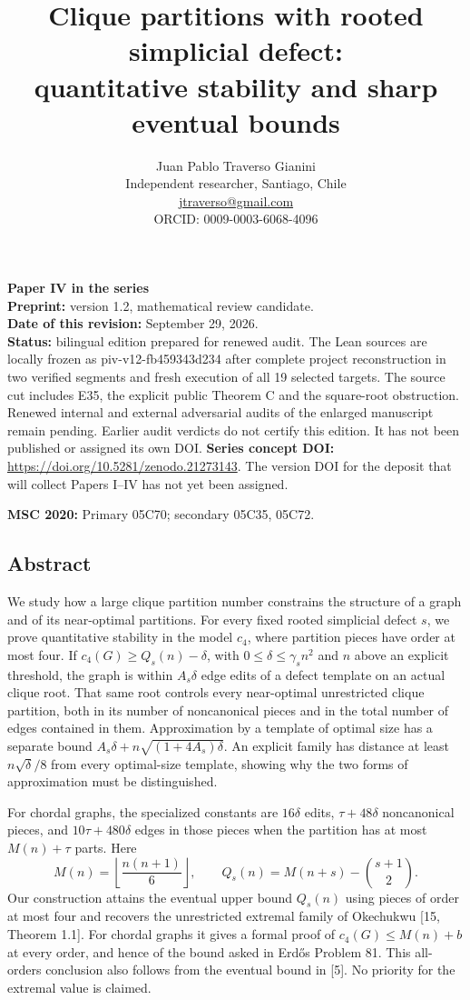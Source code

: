 \documentclass[english,11pt,a4paper]{article}
\title{Clique partitions with rooted simplicial defect:\\quantitative stability and sharp eventual bounds}
\author{Juan Pablo Traverso Gianini\\
\small Independent researcher, Santiago, Chile\\
\small \href{mailto:jtraverso@gmail.com}{jtraverso@gmail.com}\\
\small ORCID: 0009-0003-6068-4096}
\date{}
\begin{document}
\raggedbottom
\maketitle
\textbf{Paper IV in the series}\\
\textbf{Preprint:} version 1.2, mathematical review candidate.\\
\textbf{Date of this revision:} September 29, 2026.\\
\textbf{Status:} bilingual edition prepared for renewed audit. The Lean sources are locally frozen as {\ttfamily\small piv-\discretionary{\hbox{\ensuremath{\hookrightarrow}}}{}{}v12-\discretionary{\hbox{\ensuremath{\hookrightarrow}}}{}{}fb459343d234} after complete project reconstruction in two verified segments and fresh execution of all 19 selected targets. The source cut includes E35, the explicit public Theorem C and the square-root obstruction. Renewed internal and external adversarial audits of the enlarged manuscript remain pending. Earlier audit verdicts do not certify this edition. It has not been published or assigned its own DOI. \textbf{Series concept DOI:} \url{https://doi.org/10.5281/zenodo.21273143}. The version DOI for the deposit that will collect Papers I--IV has not yet been assigned.

\textbf{MSC 2020:} Primary 05C70; secondary 05C35, 05C72.

\subsection{Abstract}\label{abstract}

We study how a large clique partition number constrains the structure of a graph and of its near-optimal partitions. For every fixed rooted simplicial defect \(s\), we prove quantitative stability in the model \(c_4\), where partition pieces have order at most four. If \(c_4(G)\ge Q_s(n)-\delta\), with \(0\le\delta\le\gamma_s n^2\) and \(n\) above an explicit threshold, the graph is within \(A_s\delta\) edge edits of a defect template on an actual clique root. That same root controls every near-optimal unrestricted clique partition, both in its number of noncanonical pieces and in the total number of edges contained in them. Approximation by a template of optimal size has a separate bound \(A_s\delta+n\sqrt{(1+4A_s)\delta}\). An explicit family has distance at least \(n\sqrt{\delta}/8\) from every optimal-size template, showing why the two forms of approximation must be distinguished.

For chordal graphs, the specialized constants are \(16\delta\) edits, \(\tau+48\delta\) noncanonical pieces, and \(10\tau+480\delta\) edges in those pieces when the partition has at most \(M(n)+\tau\) parts. Here \[
M(n)=\left\lfloor\frac{n(n+1)}6\right\rfloor,\qquad
Q_s(n)=M(n+s)-\binom{s+1}{2}.
\] Our construction attains the eventual upper bound \(Q_s(n)\) using pieces of order at most four and recovers the unrestricted extremal family of Okechukwu {[}15, Theorem 1.1{]}. For chordal graphs it gives a formal proof of \(c_4(G)\le M(n)+b\) at every order, and hence of the bound asked in Erdős Problem 81. This all-orders conclusion also follows from the eventual bound in {[}5{]}. No priority for the extremal value is claimed.
\end{document}
